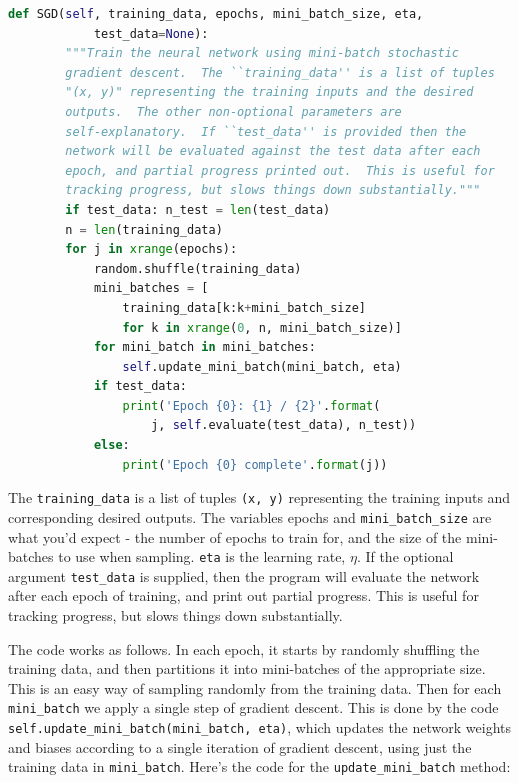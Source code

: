\begin{lstlisting}[language=Python]
def SGD(self, training_data, epochs, mini_batch_size, eta,
            test_data=None):
        """Train the neural network using mini-batch stochastic
        gradient descent.  The ``training_data'' is a list of tuples
        "(x, y)" representing the training inputs and the desired
        outputs.  The other non-optional parameters are
        self-explanatory.  If ``test_data'' is provided then the
        network will be evaluated against the test data after each
        epoch, and partial progress printed out.  This is useful for
        tracking progress, but slows things down substantially."""
        if test_data: n_test = len(test_data)
        n = len(training_data)
        for j in xrange(epochs):
            random.shuffle(training_data)
            mini_batches = [
                training_data[k:k+mini_batch_size]
                for k in xrange(0, n, mini_batch_size)]
            for mini_batch in mini_batches:
                self.update_mini_batch(mini_batch, eta)
            if test_data:
                print('Epoch {0}: {1} / {2}'.format(
                    j, self.evaluate(test_data), n_test))
            else:
                print('Epoch {0} complete'.format(j))
\end{lstlisting}
                
The \lstinline{training_data} is a list of tuples \lstinline{(x, y)} representing the training inputs and corresponding desired outputs. The variables epochs and \lstinline{mini_batch_size} are what you'd expect - the number of epochs to train for, and the size of the mini-batches to use when sampling. \lstinline{eta} is the learning rate, $\eta$. If the optional argument \lstinline{test_data} is supplied, then the program will evaluate the network after each epoch of training, and print out partial progress. This is useful for tracking progress, but slows things down substantially.

The code works as follows. In each epoch, it starts by randomly shuffling the training data, and then partitions it into mini-batches of the appropriate size. This is an easy way of sampling randomly from the training data. Then for each \lstinline{mini_batch} we apply a single step of gradient descent. This is done by the code \lstinline{self.update_mini_batch(mini_batch, eta)}, which updates the network weights and biases according to a single iteration of gradient descent, using just the training data in \lstinline{mini_batch}. Here's the code for the \lstinline{update_mini_batch} method: 

